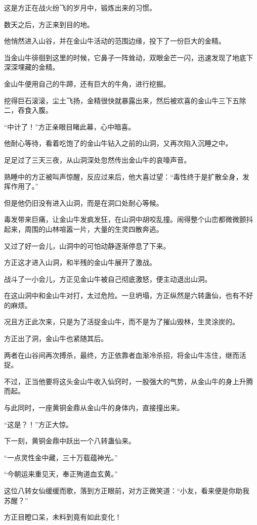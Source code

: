 \begin{this_body}
这是方正在战火纷飞的岁月中，锻炼出来的习惯。

数天之后，方正来到目的地。

他悄然进入山谷，并在金山牛活动的范围边缘，投下了一份巨大的金精。

当金山牛徘徊到这里的时候，它鼻子一阵耸动，双眼金芒一闪，迅速发现了地底下深深埋藏的金精。

金山牛便用自己的牛蹄，还有巨大的牛角，进行挖掘。

挖得巨石滚滚，尘土飞扬，金精很快就暴露出来，然后被欢喜的金山牛三下五除二，吞食入腹。

“中计了！”方正亲眼目睹此幕，心中暗喜。

他耐心等待，看着吃饱了的金山牛钻入之前的山洞，又再次陷入沉睡之中。

足足过了三天三夜，从山洞深处忽然传出金山牛的哀嚎声音。

熟睡中的方正被叫声惊醒，反应过来后，他大喜过望：“毒性终于是扩散全身，发挥作用了。”

但是他仍旧没有进入山洞，而是在洞口处耐心等候。

毒发带来巨痛，让金山牛发疯发狂，在山洞中胡咬乱撞。闹得整个山峦都微微颤抖起来，周围的山林喧嚣一片，大量的生灵四散奔逃。

又过了好一会儿，山洞中的可怕动静逐渐停息了下来。

方正这才进入山洞，和半残的金山牛展开了激战。

战斗了一小会儿，方正见金山牛被自己彻底激怒，便主动退出山洞。

在这山洞中和金山牛对打，太过危险。一旦坍塌，方正纵然是六转蛊仙，也有不好的麻烦。

况且方正此次来，只是为了活捉金山牛，而不是为了摧山毁林，生灵涂炭的。

方正出了洞，金山牛也紧随其后。

两者在山谷间再次搏杀，最终，方正依靠者血渐冷杀招，将金山牛冻住，继而活捉。

不过，正当他要将这头金山牛收入仙窍时，一股强大的气势，从金山牛的身上升腾而起。

与此同时，一座黄铜金鼎从金山牛的身体内，直接撞出来。

“这是？！”方正大惊。

下一刻，黄铜金鼎中跃出一个八转蛊仙来。

“一点灵性金中藏，三十万载蕴神光。”

“今朝运来重见天，奉正殉道血玄黄。”

这位八转女仙缓缓而歌，落到方正眼前，对方正微笑道：“小友，看来便是你助我苏醒？”

方正目瞪口呆，未料到竟有如此变化！

\end{this_body}

